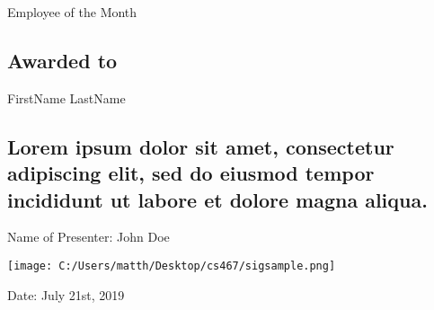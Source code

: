 \documentclass[landscape]{article}
\begin{document}
\centering
{\Huge  Employee of the Month\par}

\subsection*{Awarded to}
FirstName LastName

\subsection*{ Lorem ipsum dolor sit amet, consectetur adipiscing elit, sed do eiusmod tempor incididunt ut labore et dolore magna aliqua. }
\vfill
Name of Presenter: John Doe

\texttt{[image: C:/Users/matth/Desktop/cs467/sigsample.png]}

Date: July 21st, 2019
\end{document}
